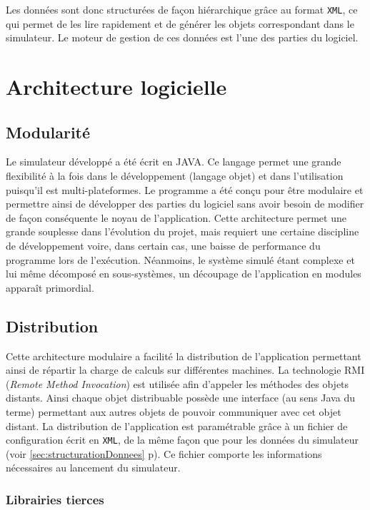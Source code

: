 \FloatBarrier

Les données sont donc structurées de façon hiérarchique grâce au format \verb!XML!, ce qui permet de les lire rapidement et de générer les objets correspondant dans le simulateur. Le moteur de gestion de ces données est l'une des parties du logiciel.

\section{Architecture logicielle}

\subsection{Modularité}
Le simulateur développé a été écrit en JAVA. Ce langage permet une grande flexibilité à la fois dans le développement (langage objet) et dans l'utilisation puisqu'il est multi-plateformes. Le programme a été conçu pour être modulaire et permettre ainsi de développer des parties du logiciel sans avoir besoin de modifier de façon conséquente le noyau de l'application. Cette architecture permet une grande souplesse dans l'évolution du projet, mais requiert une certaine discipline de développement voire, dans certain cas, une baisse de performance du programme lors de l'exécution. Néanmoins, le système simulé étant complexe et lui même décomposé en sous-systèmes, un découpage de l'application en modules apparaît primordial.

\subsection{Distribution}
Cette architecture modulaire a facilité la distribution de l'application permettant ainsi de répartir la charge de calculs sur différentes machines. La technologie RMI (\textit{Remote Method Invocation}) est utilisée afin d'appeler les méthodes des objets distants. Ainsi chaque objet distribuable possède une interface (au sens Java du terme) permettant aux autres objets de pouvoir communiquer avec cet objet distant. La distribution de l'application est paramétrable grâce à un fichier de configuration écrit en \verb!XML!, de la même façon que pour les données du simulateur (voir \ref{sec:structurationDonnees} p\pageref{sec:structurationDonnees}). Ce fichier comporte les informations nécessaires au lancement du simulateur.

\subsubsection{Librairies tierces}

